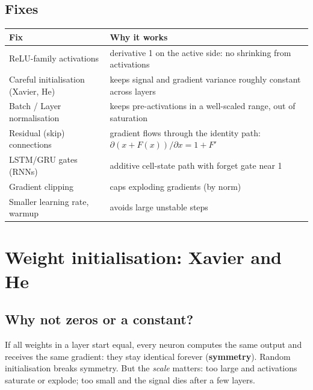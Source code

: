 \subsection{Fixes}
\begin{center}\small
\begin{tabularx}{\linewidth}{X X}
\toprule
Fix & Why it works\\
\midrule
ReLU-family activations & derivative 1 on the active side: no shrinking from activations\\
Careful initialisation (Xavier, He) & keeps signal and gradient variance roughly constant across layers\\
Batch / Layer normalisation & keeps pre-activations in a well-scaled range, out of saturation\\
Residual (skip) connections & gradient flows through the identity path: $\partial(x + F(x))/\partial x = 1 + F'$\\
LSTM/GRU gates (RNNs) & additive cell-state path with forget gate near 1\\
Gradient clipping & caps exploding gradients (by norm)\\
Smaller learning rate, warmup & avoids large unstable steps\\
\bottomrule
\end{tabularx}
\end{center}

\section{Weight initialisation: Xavier and He}
\subsection{Why not zeros or a constant?}
If all weights in a layer start equal, every neuron computes the same output and receives the same gradient: they stay identical forever (\textbf{symmetry}). Random
initialisation breaks symmetry. But the \emph{scale} matters: too large and activations saturate or explode; too small and the signal dies after a few layers.

